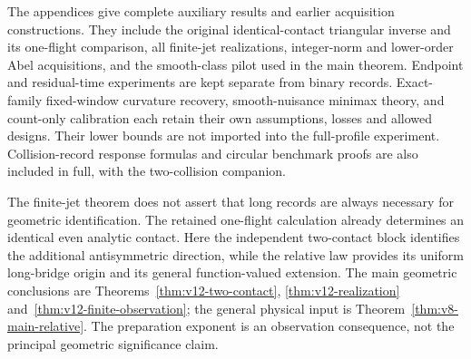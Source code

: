 The appendices give complete auxiliary results and earlier acquisition
constructions. They include the original identical-contact triangular
inverse and its one-flight comparison, all finite-jet realizations,
integer-norm and lower-order Abel acquisitions, and the smooth-class
pilot used in the main theorem. Endpoint and residual-time experiments
are kept separate from binary records. Exact-family fixed-window
curvature recovery, smooth-nuisance minimax theory, and count-only
calibration each retain their own assumptions, losses and allowed
designs. Their lower bounds are not imported into the full-profile
experiment. Collision-record response formulas and circular benchmark
proofs are also included in full, with the two-collision companion.

The finite-jet theorem does not assert that long records are always
necessary for geometric identification. The retained one-flight
calculation already determines an identical even analytic contact.
Here the independent two-contact block identifies the additional
antisymmetric direction, while the relative law provides its uniform
long-bridge origin and its general function-valued extension.
The main geometric conclusions are
Theorems~\ref{thm:v12-two-contact}, \ref{thm:v12-realization}
and~\ref{thm:v12-finite-observation}; the general physical input is
Theorem~\ref{thm:v8-main-relative}. The preparation exponent is an
observation consequence, not the principal geometric significance
claim.
